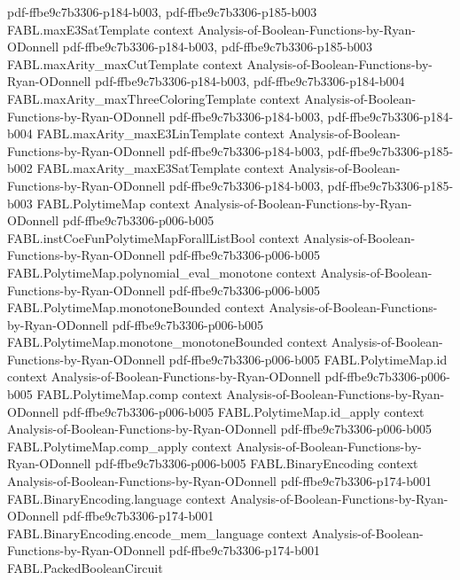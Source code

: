 \begin{theorem}
  {pdf-ffbe9c7b3306-p184-b003,
    pdf-ffbe9c7b3306-p185-b003}
\proofstep
  {FABL.maxE3SatTemplate}
  {context}
  {Analysis-of-Boolean-Functions-by-Ryan-ODonnell}
  {pdf-ffbe9c7b3306-p184-b003,
    pdf-ffbe9c7b3306-p185-b003}
\proofstep
  {FABL.maxArity_maxCutTemplate}
  {context}
  {Analysis-of-Boolean-Functions-by-Ryan-ODonnell}
  {pdf-ffbe9c7b3306-p184-b003,
    pdf-ffbe9c7b3306-p184-b004}
\proofstep
  {FABL.maxArity_maxThreeColoringTemplate}
  {context}
  {Analysis-of-Boolean-Functions-by-Ryan-ODonnell}
  {pdf-ffbe9c7b3306-p184-b003,
    pdf-ffbe9c7b3306-p184-b004}
\proofstep
  {FABL.maxArity_maxE3LinTemplate}
  {context}
  {Analysis-of-Boolean-Functions-by-Ryan-ODonnell}
  {pdf-ffbe9c7b3306-p184-b003,
    pdf-ffbe9c7b3306-p185-b002}
\proofstep
  {FABL.maxArity_maxE3SatTemplate}
  {context}
  {Analysis-of-Boolean-Functions-by-Ryan-ODonnell}
  {pdf-ffbe9c7b3306-p184-b003,
    pdf-ffbe9c7b3306-p185-b003}
\proofstep
  {FABL.PolytimeMap}
  {context}
  {Analysis-of-Boolean-Functions-by-Ryan-ODonnell}
  {pdf-ffbe9c7b3306-p006-b005}
\proofstep
  {FABL.instCoeFunPolytimeMapForallListBool}
  {context}
  {Analysis-of-Boolean-Functions-by-Ryan-ODonnell}
  {pdf-ffbe9c7b3306-p006-b005}
\proofstep
  {FABL.PolytimeMap.polynomial_eval_monotone}
  {context}
  {Analysis-of-Boolean-Functions-by-Ryan-ODonnell}
  {pdf-ffbe9c7b3306-p006-b005}
\proofstep
  {FABL.PolytimeMap.monotoneBounded}
  {context}
  {Analysis-of-Boolean-Functions-by-Ryan-ODonnell}
  {pdf-ffbe9c7b3306-p006-b005}
\proofstep
  {FABL.PolytimeMap.monotone_monotoneBounded}
  {context}
  {Analysis-of-Boolean-Functions-by-Ryan-ODonnell}
  {pdf-ffbe9c7b3306-p006-b005}
\proofstep
  {FABL.PolytimeMap.id}
  {context}
  {Analysis-of-Boolean-Functions-by-Ryan-ODonnell}
  {pdf-ffbe9c7b3306-p006-b005}
\proofstep
  {FABL.PolytimeMap.comp}
  {context}
  {Analysis-of-Boolean-Functions-by-Ryan-ODonnell}
  {pdf-ffbe9c7b3306-p006-b005}
\proofstep
  {FABL.PolytimeMap.id_apply}
  {context}
  {Analysis-of-Boolean-Functions-by-Ryan-ODonnell}
  {pdf-ffbe9c7b3306-p006-b005}
\proofstep
  {FABL.PolytimeMap.comp_apply}
  {context}
  {Analysis-of-Boolean-Functions-by-Ryan-ODonnell}
  {pdf-ffbe9c7b3306-p006-b005}
\proofstep
  {FABL.BinaryEncoding}
  {context}
  {Analysis-of-Boolean-Functions-by-Ryan-ODonnell}
  {pdf-ffbe9c7b3306-p174-b001}
\proofstep
  {FABL.BinaryEncoding.language}
  {context}
  {Analysis-of-Boolean-Functions-by-Ryan-ODonnell}
  {pdf-ffbe9c7b3306-p174-b001}
\proofstep
  {FABL.BinaryEncoding.encode_mem_language}
  {context}
  {Analysis-of-Boolean-Functions-by-Ryan-ODonnell}
  {pdf-ffbe9c7b3306-p174-b001}
\proofstep
  {FABL.PackedBooleanCircuit}

\end{theorem}
